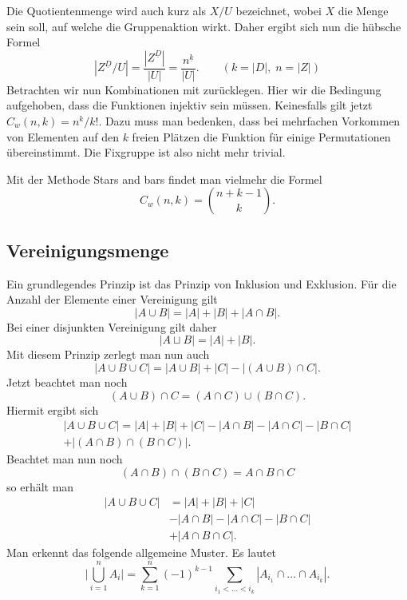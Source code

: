 \documentclass[a4paper,12pt,fleqn]{article}
\begin{document}
Die Quotientenmenge wird auch kurz als $X/U$ bezeichnet,
wobei $X$ die Menge sein soll, auf welche die Gruppenaktion wirkt.
Daher ergibt sich nun die hübsche Formel
\begin{equation}
|Z^{\underline D}/U| = \frac{|Z^{\underline D}|}{|U|}
= \frac{n^{\underline k}}{|U|}.\qquad(k=|D|,\;n=|Z|)
\end{equation}
%
Betrachten wir nun Kombinationen mit zurücklegen.
Hier wir die Bedingung aufgehoben, dass die Funktionen injektiv
sein müssen. Keinesfalls gilt jetzt $C_w(n,k)=n^k/k!$. Dazu
muss man bedenken, dass bei mehrfachen Vorkommen von Elementen
auf den $k$ freien Plätzen die Funktion für einige Permutationen
übereinstimmt. Die Fixgruppe ist also nicht mehr trivial.

Mit der Methode {\glqq}Stars and bars{\grqq} findet man vielmehr
die Formel
\begin{equation}
C_w(n,k) = \binom{n+k-1}{k}.
\end{equation}

\subsection{Vereinigungsmenge}
Ein grundlegendes Prinzip ist das Prinzip von Inklusion und
Exklusion. Für die Anzahl der Elemente einer Vereinigung
gilt
\begin{equation}
|A\cup B| = |A|+|B|+|A\cap B|.
\end{equation}
Bei einer disjunkten Vereinigung gilt daher
\[|A\sqcup B| = |A|+|B|.\]
Mit diesem Prinzip zerlegt man nun auch
\[|A\cup B\cup C| = |A\cup B|+|C|-|(A\cup B)\cap C|.\]
Jetzt beachtet man noch
\[(A\cup B)\cap C = (A\cap C)\cup(B\cap C).\]
Hiermit ergibt sich
\begin{gather*}
|A\cup B\cup C| = |A|+|B|+|C|-|A\cap B|-|A\cap C|-|B\cap C|\\
+|(A\cap B)\cap (B\cap C)|.
\end{gather*}
Beachtet man nun noch
\[(A\cap B)\cap (B\cap C) = A\cap B\cap C\]
so erhält man
\begin{equation}
\begin{split}
|A\cup B\cup C| &= |A|+|B|+|C|\\
&-|A\cap B|-|A\cap C|-|B\cap C|\\
&+|A\cap B\cap C|.
\end{split}
\end{equation}
Man erkennt das folgende allgemeine Muster. Es lautet
\begin{equation}
\bigg|\bigcup_{i=1}^n A_i\bigg|
= \sum_{k=1}^n (-1)^{k-1} \sum_{i_1<\ldots<i_k}
|A_{i_1}\cap\ldots\cap A_{i_k}|.
\end{equation}
\end{document}

